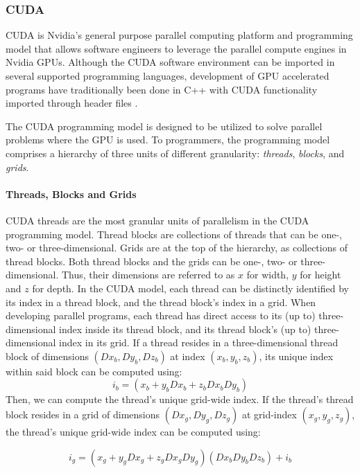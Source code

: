 \subsubsection{CUDA} \label{background:graphical_processing_units:cuda}

CUDA \cite{cuda} is Nvidia's general purpose parallel computing platform and programming model that allows software engineers to leverage the parallel compute engines in Nvidia GPUs.
Although the CUDA software environment can be imported in several supported programming languages, development of GPU accelerated programs have traditionally been done in C++ with CUDA functionality imported through header files \cite{cuda}.

The CUDA programming model is designed to be utilized to solve parallel problems where the GPU is used.
To programmers, the programming model comprises a hierarchy of three units of different granularity: \textit{threads}, \textit{blocks}, and \textit{grids}.

\paragraph{Threads, Blocks and Grids}
CUDA threads are the most granular units of parallelism in the CUDA programming model.
Thread blocks are collections of threads that can be one-, two- or three-dimensional.
Grids are at the top of the hierarchy, as collections of thread blocks.
Both thread blocks and the grids can be one-, two- or three-dimensional.
Thus, their dimensions are referred to as $x$ for width, $y$ for height and $z$ for depth.
In the CUDA model, each thread can be distinctly identified by its index in a thread block, and the thread block's index in a grid.
When developing parallel programs, each thread has direct access to its (up to) three-dimensional index inside its thread block, and its thread block's (up to) three-dimensional index in its grid.
If a thread resides in a three-dimensional thread block of dimensions $(Dx_b, Dy_b, Dz_b)$ at index $(x_b, y_b, z_b)$, its unique index within said block can be computed using:
\begin{equation}
  i_b = (x_b + y_bDx_b + z_bDx_bDy_b)
\end{equation}
Then, we can compute the thread's unique grid-wide index.
If the thread's thread block resides in a grid of dimensions $(Dx_g, Dy_g, Dz_g)$ at grid-index $(x_g, y_g, z_g)$, the thread's unique grid-wide index can be computed using:

\begin{equation}
  i_g = (x_g + y_gDx_g + z_gDx_gDy_g)(Dx_bDy_bDz_b) + i_b
\end{equation}


